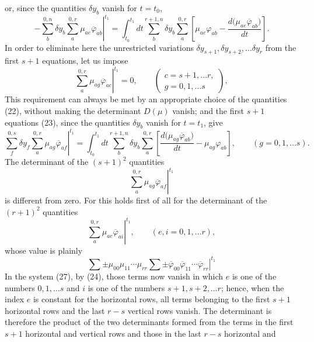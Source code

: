 \documentclass[11pt,a4paper,leqno]{article}
\begin{document}
or, since the quantities $\delta y_b$ vanish for $t=t_0$,
\begin{equation}\tag{23}
-\left.
\sum_b^{0,n}\delta y_b\sum_a^{0,r}\mu_{ae}\overline{\varphi}_{ab}
\right|^{t_1}
=
\int_{t_0}^{t_1}dt\sum_b^{r+1,n}\delta y_b\sum_a^{0,r}
\left[
\mu_{ae}\varphi_{ab}-\frac{d\bigl(\mu_{ae}\overline{\varphi}_{ab}\bigr)}{dt}
\right].
\end{equation}
In order to eliminate here the unrestricted variations $\delta y_{s+1},\delta y_{s+2},\ldots\delta y_r$ from the first $s+1$ equations, let us impose
\begin{equation}\tag{24}
\left.\sum_a^{0,r}\mu_{ag}\overline{\varphi}_{ac}\right|^{t_1}=0,
\qquad
\left(
\begin{gathered}
c=s+1,\ldots r,\\
g=0,1,\ldots s
\end{gathered}
\right),
\end{equation}
This requirement can always be met by an appropriate choice of the quantities (22), without making the determinant $D(\mu)$ vanish; and the first $s+1$ equations (23), since the quantities $\delta y_b$ vanish for $t=t_1$, give
\begin{equation}\tag{25}
\left.
\sum_f^{0,s}\delta y_f\sum_a^{0,r}\mu_{ag}\overline{\varphi}_{af}
\right|^{t_1}
=
\int_{t_0}^{t_1}dt\sum_b^{r+1,n}\delta y_b\sum_a^{0,r}
\left[
\frac{d\bigl(\mu_{ag}\overline{\varphi}_{ab}\bigr)}{dt}
-\mu_{ag}\varphi_{ab}
\right],
\qquad(g=0,1,\ldots s).
\end{equation}
The determinant of the $(s+1)^2$ quantities
\begin{equation}\tag{26}
\left.\sum_a^{0,r}\mu_{ag}\overline{\varphi}_{af}\right|^{t_1}
\end{equation}
is different from zero. For this holds first of all for the determinant of the $(r+1)^2$ quantities
\begin{equation}\tag{27}
\left.\sum_a^{0,r}\mu_{ae}\overline{\varphi}_{ai}\right|^{t_1},
\qquad(e,i=0,1,\ldots r),
\end{equation}
whose value is plainly
\[
\left.
\sum\mathord{\pm}\mu_{00}\mu_{11}\cdots\mu_{rr}
\sum\mathord{\pm}\overline{\varphi}_{00}\overline{\varphi}_{11}\cdots
\overline{\varphi}_{rr}
\right|^{t_1}
\]
In the system (27), by (24), those terms now vanish in which $e$ is one of the numbers $0,1,\ldots s$ and $i$ is one of the numbers $s+1,s+2,\ldots r$; hence, when the index $e$ is constant for the horizontal rows, all terms belonging to the first $s+1$ horizontal rows and the last $r-s$ vertical rows vanish. The determinant is therefore the product of the two determinants formed from the terms in the first $s+1$ horizontal and vertical rows and those in the last $r-s$ horizontal and
\end{document}
